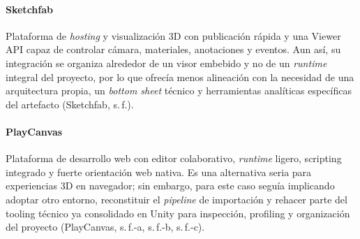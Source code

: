 \paragraph{Sketchfab} Plataforma de \textit{hosting} y visualización 3D con publicación rápida y una Viewer API capaz de controlar cámara, materiales, anotaciones y eventos. Aun así, su integración se organiza alrededor de un visor embebido y no de un \textit{runtime} integral del proyecto, por lo que ofrecía menos alineación con la necesidad de una arquitectura propia, un \textit{bottom sheet} técnico y herramientas analíticas específicas del artefacto (Sketchfab, s.\,f.).

\paragraph{PlayCanvas} Plataforma de desarrollo web con editor colaborativo, \textit{runtime} ligero, scripting integrado y fuerte orientación web nativa. Es una alternativa seria para experiencias 3D en navegador; sin embargo, para este caso seguía implicando adoptar otro entorno, reconstituir el \textit{pipeline} de importación y rehacer parte del tooling técnico ya consolidado en Unity para inspección, profiling y organización del proyecto (PlayCanvas, s.\,f.-a, s.\,f.-b, s.\,f.-c).

